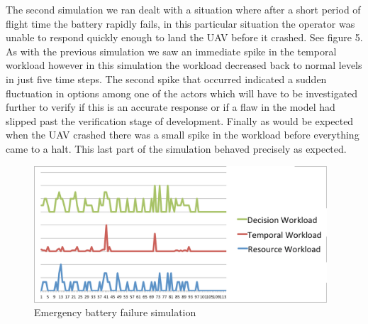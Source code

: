 The second simulation we ran dealt with a situation where after a short period of flight time the battery rapidly fails, in this particular situation the operator was unable to respond quickly enough to land the UAV before it crashed. See figure 5. As with the previous simulation we saw an immediate spike in the temporal workload however in this simulation the workload decreased back to normal levels in just five time steps. The second spike that occurred indicated a sudden fluctuation in options among one of the actors which will have to be investigated further to verify if this is an accurate response or if a flaw in the model had slipped past the verification stage of development. Finally as would be expected when the UAV crashed there was a small spike in the workload before everything came to a halt. This last part of the simulation behaved precisely as expected.

\begin{figure}[h]
\center
\setlength{\abovecaptionskip}{1mm}
\setlength{\belowcaptionskip}{1mm}
\setlength{\textfloatsep}{1mm}
\setlength{\floatsep}{1mm}
\includegraphics[height=2in]{WorkloadCrashedLabeled.png}
\caption{Emergency battery failure simulation}
\label{fig:WorkloadSim1}
\end{figure}